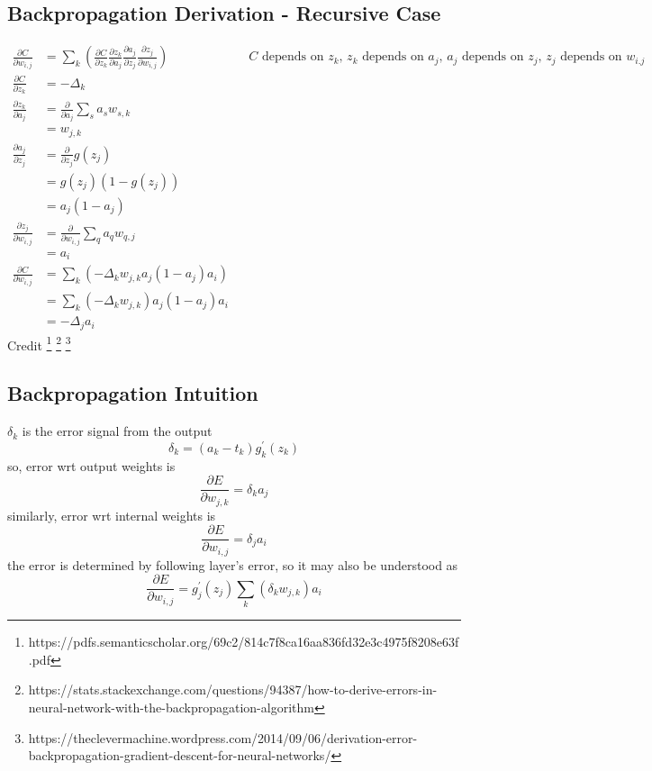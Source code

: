 \documentclass[11pt, oneside]{article}
\begin{document}
\subsection{Backpropagation Derivation - Recursive Case}
	\begin{align*}
		\frac {\partial C}{\partial w_{i,j}} &= \sum_k (\frac{\partial C}{\partial z_k} \frac{\partial z_k}{\partial a_j} \frac{\partial a_j}{\partial z_j} \frac{\partial z_j}{\partial w_{i,j}})
			&& \text{$C$ depends on $z_k$, $z_k$ depends on $a_j$, $a_j$ depends on $z_j$, $z_j$ depends on $w_{i.j}$} \\
		\frac {\partial C}{\partial z_k} &= -\Delta_k\\
		\frac {\partial z_k}{\partial a_j} &= \frac {\partial}{\partial a_j} \sum_s a_s w_{s,k}\\
		&= w_{j,k}\\
		\frac {\partial a_j}{\partial z_j} &= \frac {\partial}{\partial z_j} g(z_j)\\
		&= g(z_j)(1-g(z_j))\\
		&= a_j(1 - a_j)\\
		\frac {\partial z_j}{\partial w_{i,j}} &= \frac {\partial}{\partial w_{i,j}} \sum_q a_q w_{q,j}\\
		&= a_i\\
		\frac {\partial C}{\partial w_{i,j}} &= \sum_k (-\Delta_k w_{j,k} a_j(1 - a_j) a_i)\\
		&= \sum_k (-\Delta_k w_{j,k}) a_j(1 - a_j) a_i\\
		&= -\Delta_j a_i
	\end{align*}
	Credit
	\footnote{https://pdfs.semanticscholar.org/69c2/814c7f8ca16aa836fd32e3c4975f8208e63f.pdf}
	\footnote{https://stats.stackexchange.com/questions/94387/how-to-derive-errors-in-neural-network-with-the-backpropagation-algorithm}
	\footnote{https://theclevermachine.wordpress.com/2014/09/06/derivation-error-backpropagation-gradient-descent-for-neural-networks/}

\subsection{Backpropagation Intuition}
	$\delta_k$ is the error signal from the output
	\begin{equation*}
		\delta_k = (a_k - t_k)g^\prime_k(z_k)
	\end{equation*}
	so, error wrt output weights is
	\begin{equation*}
		\frac {\partial E}{\partial w_{j,k}} = \delta_k a_j
	\end{equation*}
	similarly, error wrt internal weights is
	\begin{equation*}
		\frac {\partial E}{\partial w_{i,j}} = \delta_j a_i
	\end{equation*}
	the error is determined by following layer's error, so it may also be understood as
	\begin{equation*}
		\frac {\partial E}{\partial w_{i,j}} = g^\prime_j(z_j) \sum_k (\delta_k w_{j,k}) a_i
	\end{equation*}
\end{document}
